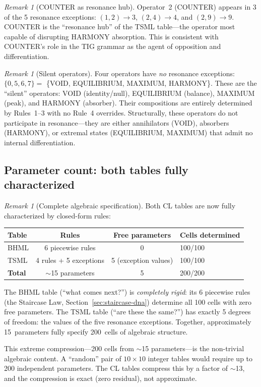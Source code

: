 \documentclass[11pt]{article}
\theoremstyle{definition}
\theoremstyle{remark}
\newtheorem{remark}[theorem]{Remark}
\begin{document}
\begin{remark}[COUNTER as resonance hub]
\label{rem:counter-hub}
Operator~2 (COUNTER) appears in 3 of the 5 resonance exceptions:
$(1,2)\to 3$, $(2,4)\to 4$, and $(2,9)\to 9$.  COUNTER is the ``resonance
hub'' of the TSML table---the operator most capable of disrupting HARMONY
absorption.  This is consistent with COUNTER's role in the TIG grammar as the
agent of opposition and differentiation.
\end{remark}

\begin{remark}[Silent operators]
\label{rem:silent-ops}
Four operators have \emph{no} resonance exceptions: $\{0, 5, 6, 7\} =$
\{VOID, EQUILIBRIUM, MAXIMUM, HARMONY\}.  These are the ``silent'' operators:
VOID (identity/null), EQUILIBRIUM (balance), MAXIMUM (peak), and HARMONY
(absorber).  Their compositions are entirely determined by Rules~1--3 with no
Rule~4 overrides.  Structurally, these operators do not participate in
resonance---they are either annihilators (VOID), absorbers (HARMONY), or
extremal states (EQUILIBRIUM, MAXIMUM) that admit no internal differentiation.
\end{remark}

\subsection{Parameter count: both tables fully characterized}

\begin{remark}[Complete algebraic specification]
\label{rem:full-characterization}
Both CL tables are now fully characterized by closed-form rules:

\begin{center}
\begin{tabular}{lccl}
\toprule
\textbf{Table} & \textbf{Rules} & \textbf{Free parameters} & \textbf{Cells determined} \\
\midrule
BHML & 6 piecewise rules & 0 & 100/100 \\
TSML & 4 rules + 5 exceptions & 5 (exception values) & 100/100 \\
\midrule
\textbf{Total} & $\sim$15 parameters & 5 & 200/200 \\
\bottomrule
\end{tabular}
\end{center}

\noindent
The BHML table (``what comes next?'') is \emph{completely rigid}: its 6
piecewise rules (the Staircase Law, Section~\ref{sec:staircase-dna}) determine all
100 cells with zero free parameters.  The TSML table (``are these the same?'')
has exactly 5 degrees of freedom: the values of the five resonance exceptions.
Together, approximately 15~parameters fully specify 200~cells of algebraic
structure.

This extreme compression---200 cells from $\sim$15 parameters---is the
non-trivial algebraic content.  A ``random'' pair of $10\times 10$ integer
tables would require up to 200 independent parameters.  The CL tables compress
this by a factor of $\sim$13, and the compression is exact (zero residual), not
approximate.
\end{remark}
\end{document}
